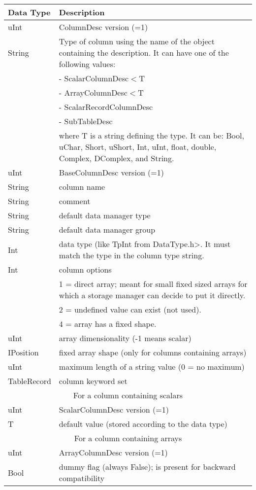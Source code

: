 \vspace{0.15in}
\begin{tabular}{|l|p{13cm}|} \hline
  Data Type & Description \\ \hline\hline
  uInt & ColumnDesc version (=1) \\
  String & Type of column using the name of the object containing the
  description. It can have one of the following values:
  \tabularnewline & - ScalarColumnDesc$<$T
  \tabularnewline & - ArrayColumnDesc$<$T
  \tabularnewline & - ScalarRecordColumnDesc
  \tabularnewline & - SubTableDesc
  \tabularnewline & where T is a string defining the type. It can be:
  Bool, uChar, Short, uShort, Int, uInt, float, double, Complex, DComplex,
  and String. \\
  \hline
  uInt & BaseColumnDesc version (=1) \\
  String & column name \\
  String & comment \\
  String & default data manager type \\
  String & default data manager group \\
  Int & data type (like TpInt from DataType.h>. It must match the type
  in the column type string. \\
  Int & column options
  \tabularnewline & 1 = direct array; meant for small fixed sized
  arrays for which a storage manager can decide to put it directly.
  \tabularnewline & 2 = undefined value can exist (not used).
  \tabularnewline & 4 = array has a fixed shape. \\
  uInt & array dimensionality (-1 means scalar) \\
  IPosition & fixed array shape (only for columns containing arrays) \\
  uInt & maximum length of a string value (0 = no maximum) \\
  TableRecord & column keyword set \\
  \hline
  \multicolumn{2}{|c|}{For a column containing scalars} \\
  \hline
  uInt & ScalarColumnDesc version (=1) \\
  T & default value (stored according to the data type) \\
  \hline
  \multicolumn{2}{|c|}{For a column containing arrays} \\
  \hline
  uInt & ArrayColumnDesc version (=1) \\
  Bool & dummy flag (always False); is present for backward compatibility \\

\end{tabular}
